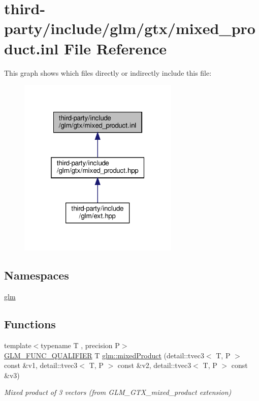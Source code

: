 \hypertarget{mixed__product_8inl}{}\section{third-\/party/include/glm/gtx/mixed\+\_\+product.inl File Reference}
\label{mixed__product_8inl}
This graph shows which files directly or indirectly include this file\+:
\nopagebreak
\begin{figure}[H]
\begin{center}
\leavevmode
\includegraphics[width=217pt]{mixed__product_8inl__dep__incl}
\end{center}
\end{figure}
\subsection*{Namespaces}
\begin{DoxyCompactItemize}
\item 
 \hyperlink{namespaceglm}{glm}
\end{DoxyCompactItemize}
\subsection*{Functions}
\begin{DoxyCompactItemize}
\item 
{\footnotesize template$<$typename T , precision P$>$ }\\\hyperlink{setup_8hpp_a33fdea6f91c5f834105f7415e2a64407}{G\+L\+M\+\_\+\+F\+U\+N\+C\+\_\+\+Q\+U\+A\+L\+I\+F\+I\+ER} T \hyperlink{group__gtx__mixed__product_ga3c7ec94fdd2b088eac78fb4a0211f32d}{glm\+::mixed\+Product} (detail\+::tvec3$<$ T, P $>$ const \&v1, detail\+::tvec3$<$ T, P $>$ const \&v2, detail\+::tvec3$<$ T, P $>$ const \&v3)
\begin{DoxyCompactList}\small\item\em Mixed product of 3 vectors (from G\+L\+M\+\_\+\+G\+T\+X\+\_\+mixed\+\_\+product extension) \end{DoxyCompactList}\end{DoxyCompactItemize}
